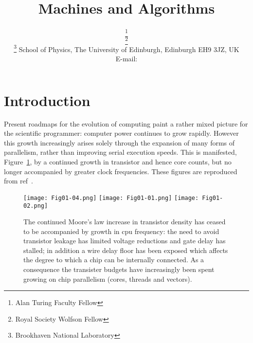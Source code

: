 \documentclass{PoS}
\title{Machines and Algorithms}
\author{\speaker{Peter Boyle}%
      \thanks{Alan Turing Faculty Fellow}\\
      \thanks{Royal Society Wolfson Fellow}\\
      \thanks{Brookhaven National Laboratory}
      School of Physics, The University of Edinburgh, Edinburgh EH9 3JZ, UK\\
      E-mail: \email{paboyle@ph.ed.ac.uk}}
\begin{document}
\section{Introduction}

Present roadmaps for the evolution of computing paint a rather mixed picture for the scientific programmer: computer
power continues to grow rapidly. However this growth increasingly arises solely
through the expansion of many forms of parallelism, rather than improving serial execution speeds.
This is manifested, Figure~\ref{fig:reinders}, by a continued growth in transistor and hence core counts,
but no longer accompanied by greater clock frequencies. These figures are reproduced from ref~\cite{KNLbook}.

\begin{figure}[hbt]
\texttt{[image: Fig01-04.png]}
\texttt{[image: Fig01-01.png]}
\texttt{[image: Fig01-02.png]}
\caption{ \label{fig:reinders} The continued Moore's law increase in transistor density has ceased to be accompanied
by growth in cpu frequency\cite{KNLbook,borkar}: the need to avoid transistor leakage has limited voltage reductions and gate delay 
has stalled; in addition a wire delay floor has been exposed which affects the degree to which a chip can be internally connected.
As a consequence the transister budgets have increasingly been spent growing on chip parallelism (cores, threads and vectors).}
\end{figure}
\end{document}
